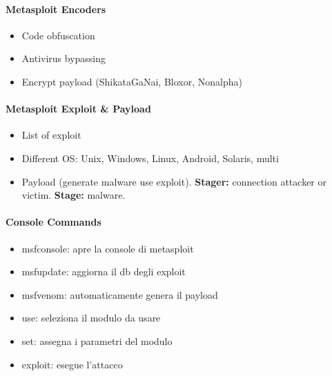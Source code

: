 \documentclass{article}
\begin{document}
\paragraph{Metasploit Encoders}
\begin{itemize}
    \item Code obfuscation
    \item Antivirus bypassing
    \item Encrypt payload (ShikataGaNai, Bloxor, Nonalpha)
\end{itemize}
\paragraph{Metasploit Exploit \& Payload}
\begin{itemize}
    \item List of exploit
    \item Different OS: Unix, Windows, Linux, Android, Solaris, multi
    \item Payload (generate malware use exploit). \textbf{Stager:} connection attacker or victim. 
     \textbf{Stage:} malware.
\end{itemize}
\paragraph{Console Commands}
\begin{itemize}
    \item msfconsole: apre la console di metasploit
    \item msfupdate: aggiorna il db degli exploit
    \item msfvenom: automaticamente genera il payload
    \item use: seleziona il modulo da usare
    \item set: assegna i parametri del modulo
    \item exploit: esegue l’attacco
\end{itemize}
\end{document}
